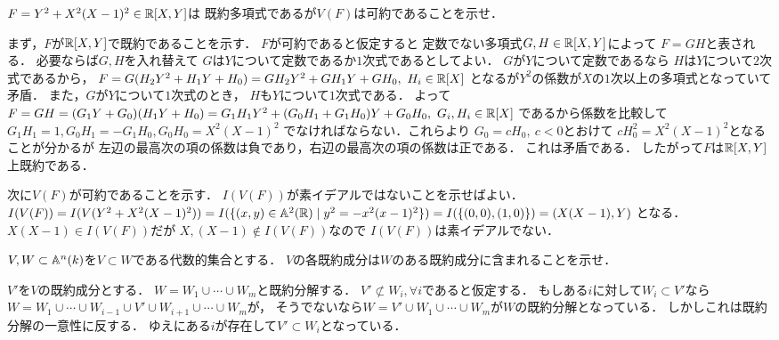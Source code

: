\begin{prob}
  $F = Y^2 + X^2(X-1)^2 \in \mathbb{R}[X,Y] $は
  既約多項式であるが$V(F)$は可約であることを示せ．
\end{prob}
\begin{ans}
  まず，$F$が$\mathbb{R}[X,Y]$で既約であることを示す．
  $F$が可約であると仮定すると
  定数でない多項式$G,H \in \mathbb{R}[X,Y]$によって
  $F = GH$と表される．
  必要ならば$G,H$を入れ替えて
  $G$は$Y$について定数であるか$1$次式であるとしてよい．
  $G$が$Y$について定数であるなら
  $H$は$Y$について$2$次式であるから，
  $F = G(H_2Y^2 + H_1Y + H_0) = GH_2Y^2 + GH_1Y + GH_0 ,\ H_i \in \mathbb{R}[X] $
  となるが$Y^2$の係数が$X$の$1$次以上の多項式となっていて矛盾．
  また，$G$が$Y$について$1$次式のとき，
  $H$も$Y$について$1$次式である．
  よって
  $ F = GH = (G_1Y + G_0)(H_1Y + H_0)
  = G_1H_1 Y^2 + (G_0H_1 + G_1H_0) Y + G_0H_0, \ G_i, H_i \in \mathbb{R}[X] $
  であるから係数を比較して
  $G_1 H_1 = 1, G_0 H_1 = -G_1 H_0, G_0H_0 = X^2(X-1)^2 $
  でなければならない．これらより
  $ G_0 = c H_0 , \ c < 0$とおけて
  $c H_0^2 = X^2(X-1)^2 $となることが分かるが
  左辺の最高次の項の係数は負であり，右辺の最高次の項の係数は正である．
  これは矛盾である．
  したがって$F$は$\mathbb{R}[X,Y]$上既約である．
  
  次に$V(F)$が可約であることを示す．
  $I(V(F))$が素イデアルではないことを示せばよい．
  $I(V(F)) = I(V(Y^2 + X^2(X-1)^2))
  = I( \{ (x,y)\in\mathbb{A}^2(\mathbb{R}) \mid y^2 = -x^2(x-1)^2 \} )
  = I( \{ (0,0), (1,0) \} )
  = (X(X-1), Y) $
  となる．
  $X(X-1) \in I(V(F))$だが
  $X,(X-1) \not\in I(V(F)) $なので
  $I(V(F))$は素イデアルでない．
\end{ans}

\begin{prob}
  $V,W\subset \mathbb{A}^n(k)$を$V\subset W$である代数的集合とする．
  $V$の各既約成分は$W$のある既約成分に含まれることを示せ．
\end{prob}
\begin{ans}
  $V'$を$V$の既約成分とする．
  $W = W_1 \cup \cdots \cup W_m $と既約分解する．
  $V' \not \subset W_i, \forall i$であると仮定する．
  もしある$i$に対して$W_i \subset V'$なら
  $W = W_1 \cup \cdots \cup W_{i-1} \cup V' \cup W_{i+1} \cup \cdots \cup W_m $が，
  そうでないなら$W = V' \cup W_1 \cup \cdots \cup W_m $が$W$の既約分解となっている．
  しかしこれは既約分解の一意性に反する．
  ゆえにある$i$が存在して$V' \subset W_i $となっている．
\end{ans}
